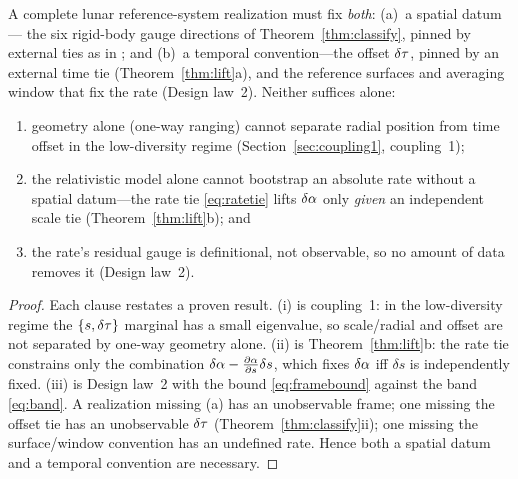 \begin{theorem}
\label{thm:system}
A complete lunar reference-system realization must fix \emph{both}: (a)~a spatial datum---%
the six rigid-body gauge directions of Theorem~\ref{thm:classify}, pinned by external ties
as in \citep{baweja2026datum}; and (b)~a temporal convention---the offset $\delta\tau$, pinned by
an external time tie (Theorem~\ref{thm:lift}a), and the reference surfaces and averaging
window that fix the rate (Design law~2). Neither suffices alone:
\begin{enumerate}
\item[(i)] geometry alone (one-way ranging) cannot separate radial position from time
offset in the low-diversity regime (Section~\ref{sec:coupling1}, coupling~1);
\item[(ii)] the relativistic model alone cannot bootstrap an absolute rate without a spatial
datum---the rate tie \eqref{eq:ratetie} lifts $\delta\alpha$ only \emph{given} an independent
scale tie (Theorem~\ref{thm:lift}b); and
\item[(iii)] the rate's residual gauge is definitional, not observable, so no amount of data
removes it (Design law~2).
\end{enumerate}
\end{theorem}

\begin{proof}
Each clause restates a proven result. (i) is coupling~1: in the low-diversity regime the
$\{s,\delta\tau\}$ marginal has a small eigenvalue, so scale/radial and offset are not separated
by one-way geometry alone. (ii) is Theorem~\ref{thm:lift}b: the rate tie constrains only the
combination $\delta\alpha-\tfrac{\partial\alpha}{\partial s}\delta s$, which fixes $\delta\alpha$ iff
$\delta s$ is independently fixed. (iii) is Design law~2 with the bound \eqref{eq:framebound}
against the band \eqref{eq:band}. A realization missing (a) has an unobservable
frame; one missing the offset tie has an unobservable $\delta\tau$ (Theorem~\ref{thm:classify}ii);
one missing the surface/window convention has an undefined rate. Hence both a spatial datum
and a temporal convention are necessary.
\end{proof}

